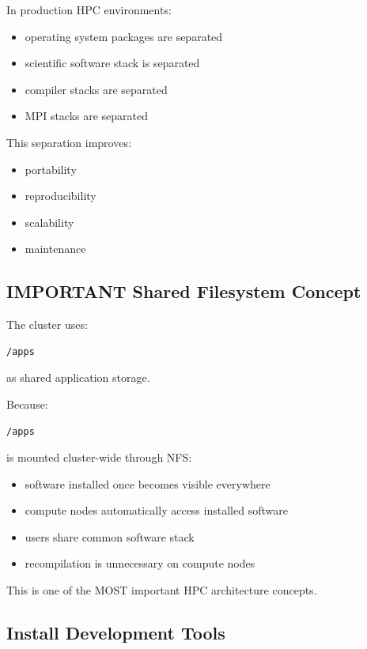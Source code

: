 \documentclass[11pt]{article}
\begin{document}
In production HPC environments:

\begin{itemize}
\item operating system packages are separated
\item scientific software stack is separated
\item compiler stacks are separated
\item MPI stacks are separated
\end{itemize}

This separation improves:

\begin{itemize}
\item portability
\item reproducibility
\item scalability
\item maintenance
\end{itemize}
\subsection{IMPORTANT Shared Filesystem Concept}
\label{sec:orga8eac24}

The cluster uses:

\begin{verbatim}
/apps
\end{verbatim}

as shared application storage.

Because:

\begin{verbatim}
/apps
\end{verbatim}

is mounted cluster-wide through NFS:

\begin{itemize}
\item software installed once becomes visible everywhere
\item compute nodes automatically access installed software
\item users share common software stack
\item recompilation is unnecessary on compute nodes
\end{itemize}

This is one of the MOST important HPC architecture concepts.
\subsection{Install Development Tools}
\label{sec:org0491b86}
\end{document}
